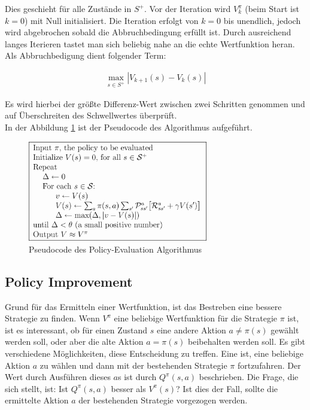 \documentclass[10pt]{scrartcl}
\begin{document}
Dies geschieht für alle Zustände in $S^+$. Vor der Iteration wird $V^\pi_k$  (beim Start ist $k=0$) mit Null initialisiert. Die Iteration erfolgt von $k=0$ bis unendlich, jedoch wird abgebrochen sobald die  Abbruchbedingung erfüllt ist. Durch ausreichend langes Iterieren tastet man sich beliebig nahe an die echte Wertfunktion heran. Als Abbruchbedigung dient folgender Term:

\begin{align}
\max\limits_{s\in S^+} |V_{k+1}(s)-V_k(s)|
\end{align}

Es wird hierbei der größte Differenz-Wert zwischen zwei Schritten genommen und  auf Überschreiten des Schwellwertes überprüft.\\
In der Abbildung \ref{fig:policyevaluation} ist der Pseudocode des Algorithmus aufgeführt.

\begin{figure}[htc]
    \centering
    \includegraphics[width=0.7\textwidth]{Grafiken/21pe.png}
    \caption{Pseudocode des Policy-Evaluation Algorithmus}
    \label{fig:policyevaluation}
\end{figure}

\subsection{Policy Improvement}
Grund für das Ermitteln einer Wertfunktion, ist das Bestreben eine bessere Strategie zu finden. Wenn $V^\pi$ eine beliebige Wertfunktion für die  Strategie $\pi$ ist,  ist es interessant, ob für einen Zustand $s$ eine andere Aktion $a\neq\pi(s)$   gewählt werden soll, oder aber die alte Aktion $a=\pi(s)$ beibehalten werden soll.
Es gibt verschiedene Möglichkeiten, diese  Entscheidung zu treffen. Eine ist, eine beliebige Aktion $a$ zu wählen und dann mit der bestehenden Strategie $\pi$ fortzufahren. Der Wert durch Ausführen dieses $a$s ist durch $Q^\pi(s,a)$ beschrieben. Die Frage, die sich stellt, ist: Ist $Q^\pi(s,a)$ besser als $V^\pi(s)$?
Ist dies der Fall, sollte die ermittelte Aktion $a$ der bestehenden Strategie vorgezogen werden.
\end{document}
